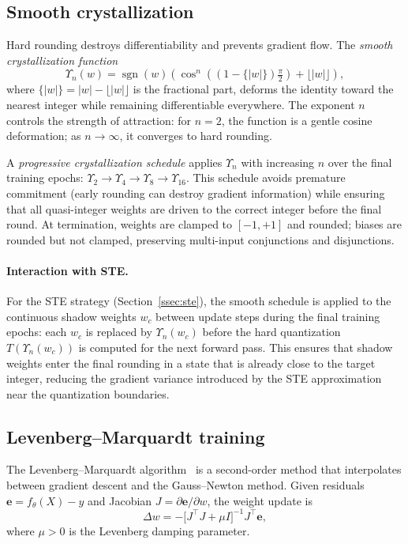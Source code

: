\documentclass[lettersize,journal]{IEEEtran}
\begin{document}
\subsection{Smooth crystallization}
\label{ssec:smooth}

Hard rounding destroys differentiability and prevents gradient flow.
The \emph{smooth crystallization function}
\begin{equation}
  \Upsilon_n(w) = \operatorname{sgn}(w)\!\left(
    \cos^n\!\!\left((1 - \{|w|\})\tfrac{\pi}{2}\right) + \lfloor|w|\rfloor
  \right),
  \label{eq:upsilon}
\end{equation}
where $\{|w|\} = |w| - \lfloor|w|\rfloor$ is the fractional part,
deforms the identity toward the nearest integer while remaining
differentiable everywhere.
The exponent $n$ controls the strength of attraction: for $n = 2$, the
function is a gentle cosine deformation; as $n \to \infty$, it converges
to hard rounding.

A \emph{progressive crystallization schedule} applies $\Upsilon_n$ with
increasing $n$ over the final training epochs:
$\Upsilon_2 \to \Upsilon_4 \to \Upsilon_8 \to \Upsilon_{16}$.
This schedule avoids premature commitment (early rounding can destroy
gradient information) while ensuring that all quasi-integer weights are
driven to the correct integer before the final round.
At termination, weights are clamped to $[-1, +1]$ and rounded; biases
are rounded but not clamped, preserving multi-input conjunctions and
disjunctions.

\paragraph{Interaction with STE.}
For the STE strategy (Section~\ref{ssec:ste}), the smooth schedule is
applied to the continuous shadow weights $w_c$ between update steps during
the final training epochs: each $w_c$ is replaced by $\Upsilon_n(w_c)$
before the hard quantization $T(\Upsilon_n(w_c))$ is computed for the next
forward pass.
This ensures that shadow weights enter the final rounding in a state
that is already close to the target integer, reducing the gradient variance
introduced by the STE approximation near the quantization boundaries.

\subsection{Levenberg--Marquardt training}
\label{ssec:lm}

The Levenberg--Marquardt algorithm~\cite{levenberg1944,marquardt1963} is a
second-order method that interpolates between gradient descent and the
Gauss--Newton method.
Given residuals $\mathbf{e} = f_\theta(X) - y$ and Jacobian
$J = \partial \mathbf{e}/\partial w$, the weight update is
\begin{equation}
  \Delta w = -\bigl[J^\top J + \mu I\bigr]^{-1} J^\top \mathbf{e},
  \label{eq:lm}
\end{equation}
where $\mu > 0$ is the Levenberg damping parameter.
\end{document}
